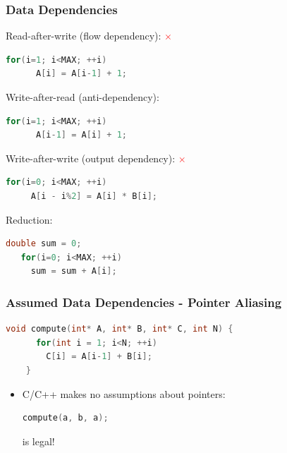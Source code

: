 \documentclass{beamer}
\begin{document}
\begin{frame}[fragile]
  \frametitle{Data Dependencies}
  Read-after-write (flow dependency): \textcolor{red}{$\times$}
  \begin{lstlisting}[language=C++]
    for(i=1; i<MAX; ++i) 
      A[i] = A[i-1] + 1;
  \end{lstlisting}
  Write-after-read (anti-dependency): \textcolor{green}{\checkmark}
  \begin{lstlisting}[language=C++]
    for(i=1; i<MAX; ++i) 
      A[i-1] = A[i] + 1;
  \end{lstlisting}
  Write-after-write (output dependency): \textcolor{red}{$\times$}
  \begin{lstlisting}[language=C++]
   for(i=0; i<MAX; ++i)
     A[i - i%2] = A[i] * B[i]; 
  \end{lstlisting}
  Reduction: \textcolor{green}{\checkmark}
  \begin{lstlisting}[language=C++]
   double sum = 0;
   for(i=0; i<MAX; ++i)
     sum = sum + A[i];
  \end{lstlisting}
\end{frame}

\begin{frame}[fragile]
  \frametitle{Assumed Data Dependencies - Pointer Aliasing}
  \begin{lstlisting}[language=C++]
    void compute(int* A, int* B, int* C, int N) {
      for(int i = 1; i<N; ++i) 
        C[i] = A[i-1] + B[i];
    }
  \end{lstlisting}
  
  \begin{itemize}
   \item C/C++ makes no assumptions about pointers:
   \begin{lstlisting}[language=C++]
      compute(a, b, a);
  \end{lstlisting}
  is legal!
  \end{itemize}

  
  
  \begin{lstlisting}[language=C++]

  \end{lstlisting}
\end{frame}
\end{document}
